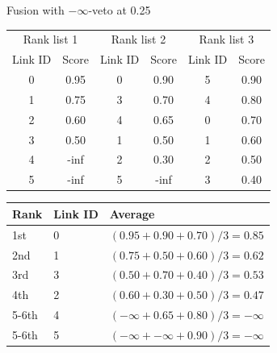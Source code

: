 \begin{example}
  \centering
  \caption{Fusion with $-\infty$-veto at 0.25}
  \label{ex:veto_ninf}

  \begin{subexample}{\linewidth}
    \centering
    \begin{tabular}{c c|c c|c c}
      \toprule
      \multicolumn{2}{c}{Rank list 1} &
      \multicolumn{2}{c}{Rank list 2} &
      \multicolumn{2}{c}{Rank list 3} \\
      Link ID & Score &
      Link ID & Score &
      Link ID & Score \\
      \midrule
      0 & 0.95 & 0 & 0.90 & 5 & 0.90 \\
      1 & 0.75 & 3 & 0.70 & 4 & 0.80 \\
      2 & 0.60 & 4 & 0.65 & 0 & 0.70 \\
      3 & 0.50 & 1 & 0.50 & 1 & 0.60 \\
      4 & -inf & 2 & 0.30 & 2 & 0.50 \\
      5 & -inf & 5 & -inf & 3 & 0.40 \\
      \bottomrule
    \end{tabular}
  \end{subexample}

  \vspace{0.5cm}

  \begin{subexample}{\linewidth}
    \centering
    \begin{tabular}{l l l}
      \toprule
      Rank & Link ID & Average \\
      \midrule
      1st & 0 & $(0.95 + 0.90 + 0.70)/3 = 0.85$ \\
      2nd & 1 & $(0.75 + 0.50 + 0.60)/3 = 0.62$ \\
      3rd & 3 & $(0.50 + 0.70 + 0.40)/3 = 0.53$ \\
      4th & 2 & $(0.60 + 0.30 + 0.50)/3 = 0.47$ \\
      5-6th & 4 & $(-\infty + 0.65 + 0.80)/3 = -\infty$ \\
      5-6th & 5 & $(-\infty + -\infty + 0.90)/3 = -\infty$ \\
      \bottomrule
    \end{tabular}
  \end{subexample}
\end{example}

